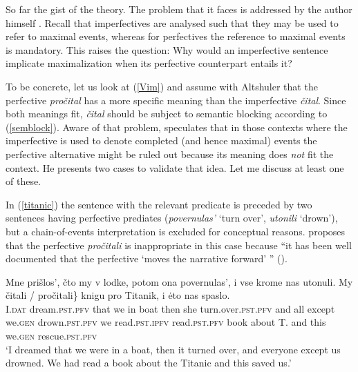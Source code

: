 \documentclass[output=paper,colorlinks,citecolor=brown]{langscibook}
\begin{document}
\noindent So far the gist of the theory. The problem that it faces is addressed by the author himself
\citep[765ff.]{Altshuler2014}. Recall that imperfectives are analysed such that they may be used to refer to maximal events, whereas for perfectives the reference to maximal events is mandatory.  
This raises the question: Why would an imperfective sentence implicate maximalization when its perfective counterpart entails it? 

To be concrete, let us look at (\ref{Vim}) and assume with Altshuler that the perfective \textit{pročital} has a more specific meaning than the imperfective \textit{čital}. Since both meanings fit, \textit{čital} should be subject to semantic blocking according to (\ref{semblock}).
Aware of that problem, \citet[767]{Altshuler2014} speculates that in those contexts where the imperfective is used to denote completed (and hence maximal) events
the perfective alternative might be ruled out because its meaning does \textit{not} fit the context. He presents two cases
to validate that idea. Let me discuss at least one of these. 

In (\ref{titanic}) the sentence with the relevant predicate is preceded by two sentences having perfective prediates (\textit{povernulas'} `turn over', \textit{utonili} `drown'), but a chain-of-events interpretation is excluded for conceptual reasons. \citet{Altshuler2014} proposes that the perfective \textit{pročitali} is inappropriate in this case because ``it has been well documented that the perfective `moves the narrative forward' '' (\citealt[769]{Altshuler2014}).

\ea\label{titanic}
\gll Mne prišlos',
čto
my
v
lodke,
potom
ona
povernulas',
i
vse
krome
nas
utonuli.
My
\minsp{\{} čitali /  pročitali\}
knigu
pro
Titanik,
i
ėto
nas
spaslo.\\
I.\textsc{dat} dream.\textsc{pst.pfv}
that
we
in
boat
then
she
turn.over.\textsc{pst.pfv}
and
all
except
we.\textsc{gen}
drown.\textsc{pst.pfv}
we {} read.\textsc{pst.ipfv} {} {} read.\textsc{pst.pfv} 
book
about
T.
and
this
we.\textsc{gen}
rescue.\textsc{pst.pfv}\\
\glt `I dreamed that we were in a boat, then it turned over, and everyone except us drowned. We had read a book about the Titanic and this saved us.'
\z
\end{document}
